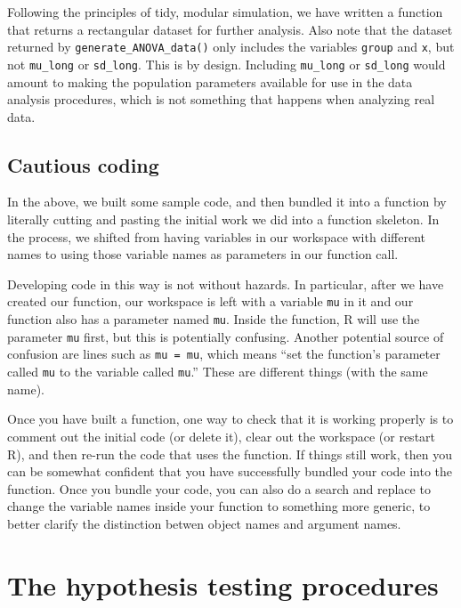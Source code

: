 \documentclass[
]{book}
\begin{document}
Following the principles of tidy, modular simulation, we have written a function that returns a rectangular dataset for further analysis.
Also note that the dataset returned by \texttt{generate\_ANOVA\_data()} only includes the variables \texttt{group} and \texttt{x}, but not \texttt{mu\_long} or \texttt{sd\_long}.
This is by design.
Including \texttt{mu\_long} or \texttt{sd\_long} would amount to making the population parameters available for use in the data analysis procedures, which is not something that happens when analyzing real data.

\subsection{Cautious coding}\label{cautious-coding}

In the above, we built some sample code, and then bundled it into a function by literally cutting and pasting the initial work we did into a function skeleton.
In the process, we shifted from having variables in our workspace with different names to using those variable names as parameters in our function call.

Developing code in this way is not without hazards.
In particular, after we have created our function, our workspace is left with a variable \texttt{mu} in it and our function also has a parameter named \texttt{mu}.
Inside the function, R will use the parameter \texttt{mu} first, but this is potentially confusing.
Another potential source of confusion are lines such as \texttt{mu\ =\ mu}, which means ``set the function's parameter called \texttt{mu} to the variable called \texttt{mu}.''
These are different things (with the same name).

Once you have built a function, one way to check that it is working properly is to comment out the initial code (or delete it), clear out the workspace (or restart R), and then re-run the code that uses the function.
If things still work, then you can be somewhat confident that you have successfully bundled your code into the function.
Once you bundle your code, you can also do a search and replace to change the variable names inside your function to something more generic, to better clarify the distinction betwen object names and argument names.

\section{The hypothesis testing procedures}\label{ANOVA-hypothesis-testing-function}
\end{document}

